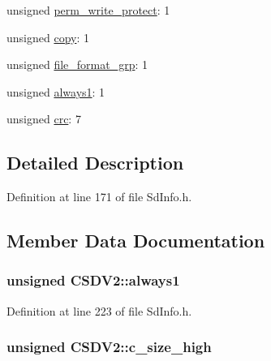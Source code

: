 \begin{DoxyCompactItemize}
\item 
unsigned \hyperlink{struct_c_s_d_v2_ae8a4cd07025c0192acc093cca8379d73}{perm\+\_\+write\+\_\+protect}\+: 1
\item 
unsigned \hyperlink{struct_c_s_d_v2_a94c3a6332d4905be59800fd59aafe5ff}{copy}\+: 1
\item 
unsigned \hyperlink{struct_c_s_d_v2_a093e6982187fdc5ba9c787c014f6296c}{file\+\_\+format\+\_\+grp}\+: 1
\item 
unsigned \hyperlink{struct_c_s_d_v2_a3bcdd97582c0d282b5e4270def81f156}{always1}\+: 1
\item 
unsigned \hyperlink{struct_c_s_d_v2_a099f7c6b9acbfa6b733fe4ab94c10ccc}{crc}\+: 7
\end{DoxyCompactItemize}


\subsection{Detailed Description}


Definition at line 171 of file Sd\+Info.\+h.



\subsection{Member Data Documentation}
\subsubsection[{\texorpdfstring{always1}{always1}}]{\setlength{\rightskip}{0pt plus 5cm}unsigned C\+S\+D\+V2\+::always1}\hypertarget{struct_c_s_d_v2_a3bcdd97582c0d282b5e4270def81f156}{}\label{struct_c_s_d_v2_a3bcdd97582c0d282b5e4270def81f156}


Definition at line 223 of file Sd\+Info.\+h.

\subsubsection[{\texorpdfstring{c\+\_\+size\+\_\+high}{c\_size\_high}}]{\setlength{\rightskip}{0pt plus 5cm}unsigned C\+S\+D\+V2\+::c\+\_\+size\+\_\+high}\hypertarget{struct_c_s_d_v2_a3bfb96cd3f44af64691bc12fbdaf6bbd}{}\label{struct_c_s_d_v2_a3bfb96cd3f44af64691bc12fbdaf6bbd}


